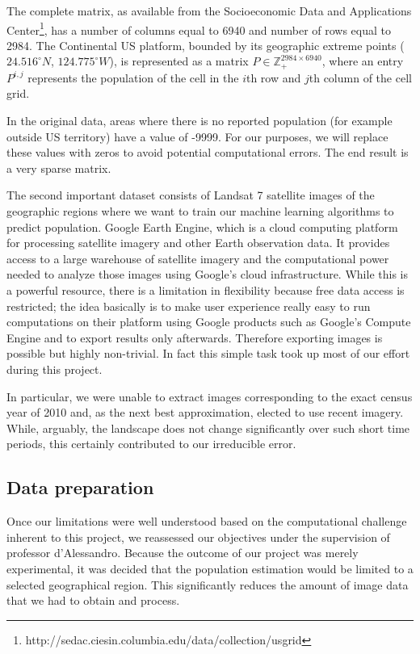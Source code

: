 \documentclass{article}
\begin{document}
The complete matrix, as available from the Socioeconomic Data and Applications Center\footnote{http://sedac.ciesin.columbia.edu/data/collection/usgrid}, has a number of columns equal to 6940 and number of rows equal to 2984. The Continental US platform, bounded by its geographic extreme points ($24.516^\circ N$, $124.775^\circ W$), is represented as a matrix $P\in\mathbb{Z}_+^{2984\times 6940}$,  where an entry $P^{i,j}$ represents the population of the cell in the $i$th row and $j$th column of the cell grid.

In the original data, areas where there is no reported population (for example outside US territory) have a value of -9999. For our purposes, we will replace these values with zeros to avoid potential computational errors. The end result is a very sparse matrix. 

The second important dataset consists of Landsat 7 satellite images of the geographic regions where we want to train our machine learning algorithms to predict population. Google Earth Engine, which is a cloud computing platform for processing satellite imagery and other Earth observation data. It provides access to a large warehouse of satellite imagery and the computational power needed to analyze those images using Google's cloud infrastructure. While this is a powerful resource, there is a limitation in flexibility because free data access is restricted; the idea basically is to make user experience really easy to run computations on their platform using Google products such as Google’s Compute Engine and to export results only afterwards. Therefore exporting images is possible but highly non-trivial. In fact this simple task took up most of our effort during this project. 

In particular, we were unable to extract images corresponding to the exact census year of 2010 and, as the next best approximation, elected to use recent imagery. While, arguably, the landscape does not change significantly over such short time periods, this certainly contributed to our irreducible error.

\subsection{Data preparation}
Once our limitations were well understood based on the computational challenge inherent to this project, we reassessed our objectives under the supervision of professor d’Alessandro. Because the outcome of our project was merely experimental, it was decided that the population estimation would be limited to a selected geographical region. This significantly reduces the amount of image data that we had to obtain and process.
\end{document}

